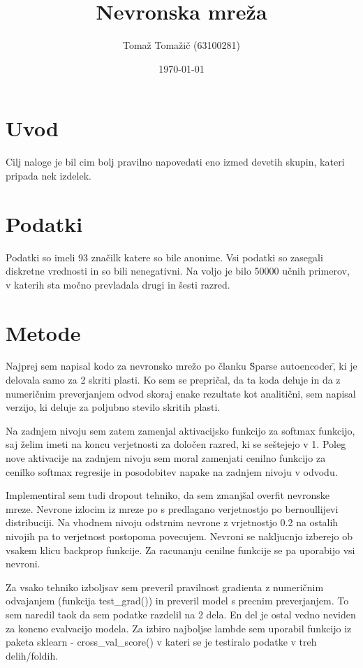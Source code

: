 \documentclass[a4paper,11pt]{article}
\title{Nevronska mreža}
\author{Tomaž Tomažič (63100281)}
\date{\today}
\begin{document}
\maketitle

\section{Uvod}

Cilj naloge je bil cim bolj pravilno napovedati eno izmed devetih skupin, kateri pripada nek izdelek.

\section{Podatki}

Podatki so imeli 93 značilk katere so bile anonime. Vsi podatki so zasegali diskretne vrednosti in so bili nenegativni.
Na voljo je bilo 50000 učnih primerov, v katerih sta močno prevladala drugi in šesti razred.

\section{Metode}

Najprej sem napisal kodo za nevronsko mrežo po članku \"Sparse autoencoder\", ki je delovala samo za 2 skriti plasti. Ko sem se prepričal, da ta koda deluje in da z numeričnim preverjanjem odvod skoraj enake rezultate kot analitični, sem napisal verzijo, ki deluje za poljubno stevilo skritih plasti.

Na zadnjem nivoju sem zatem zamenjal aktivacijsko funkcijo za softmax funkcijo, saj želim imeti na koncu verjetnosti za določen razred, ki se seštejejo v 1. Poleg nove aktivacije na zadnjem nivoju sem moral zamenjati cenilno funkcijo za cenilko softmax regresije in posodobitev napake na zadnjem nivoju v odvodu.

Implementiral sem tudi dropout tehniko, da sem zmanjšal overfit nevronske mreze. Nevrone izlocim iz mreze po s predlagano verjetnostjo po bernoullijevi distribuciji. Na vhodnem nivoju odstrnim nevrone z vrjetnostjo 0.2 na ostalih nivojih pa to verjetnost postopoma povecujem. Nevroni se nakljucnjo izberejo ob vsakem klicu backprop funkcije. Za racunanju cenilne funkcije se pa uporabijo vsi nevroni.

Za vsako tehniko izboljsav sem preveril pravilnost gradienta z numeričnim odvajanjem (funkcija test\_grad()) in preveril model s precnim preverjanjem. To sem naredil taok da sem podatke razdelil na 2 dela. En del je ostal vedno neviden za koncno evalvacijo modela. Za izbiro najboljse lambde sem uporabil funkcijo iz paketa sklearn - cross\_val\_score() v kateri se je testiralo podatke v treh delih/foldih.
\end{document}
